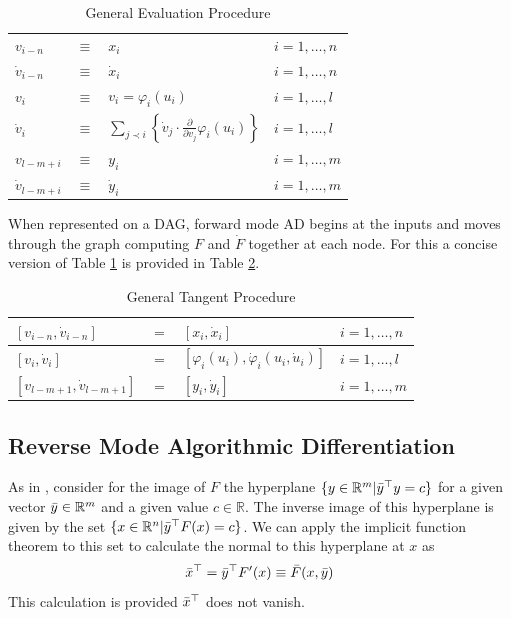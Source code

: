\documentclass{article}
\begin{document}
\begin{table}[h]
    \centering
    \begin{tabular}{|lcll|}
        \hline
        $v_{i-n}$ & $\equiv$ & $x_i$ & $i = 1, \ldots, n$ \\
        $\Dot{v}_{i-n}$ & $\equiv$ & $\Dot{x}_i$ & $i = 1, \ldots, n$ \\
        \hline
        $v_{i}$ & $\equiv$ & $v_i = \varphi_i (u_i)$ & $i = 1, \ldots, l$ \\
        $\Dot{v}_{i}$ & $\equiv$ & $\sum_{j \prec i} \left\{ \Dot{v}_j \cdot \frac{\partial}{\partial v_j} \varphi_i (u_i) \right\}$ & $i = 1, \ldots, l$ \\
        \hline
        $v_{l-m+i}$ & $\equiv$ & $y_i$ & $i = 1, \ldots, m$ \\
        $\Dot{v}_{l-m+i}$ & $\equiv$ & $\Dot{y}_i$ & $i = 1, \ldots, m$ \\
        \hline
    \end{tabular}
    \caption{General Evaluation Procedure}
    \label{tab:gep}
\end{table}

When represented on a DAG, forward mode AD begins at the inputs and moves through the graph computing $F$ and $\Dot{F}$ together at each node. For this a concise version of Table \ref{tab:gep} is provided in Table \ref{tab:gtp}.

\begin{table}[h]
    \centering
    \begin{tabular}{|lcll|}
        \hline
        $[v_{i-n}, \Dot{v}_{i-n}]$ & $=$ & $[x_{i}, \Dot{x}_{i}]$ & $i = 1, \ldots, n$ \\
        \hline
        $[v_{i}, \Dot{v}_{i}]$ & $=$ & $[\varphi_i (u_i), \Dot{\varphi}_i(u_i, \Dot{u}_i)]$ & $i = 1, \ldots, l$ \\
        \hline
        $[v_{l-m+1}, \Dot{v}_{l-m+1}]$ & $=$ & $[y_{i}, \Dot{y}_{i}]$ & $i = 1, \ldots, m$ \\
        \hline
    \end{tabular}
    \caption{General Tangent Procedure}
    \label{tab:gtp}
\end{table}

\subsection{Reverse Mode Algorithmic Differentiation}

As in \cite{dhamarticle}, consider for the image of $F$ the hyperplane $\{ y \in \mathbb{R}^m | \Bar{y}^\top y = c\}$ for a given vector $\Bar{y} \in \mathbb{R}^m$ and a given value $c \in \mathbb{R}$. The inverse image of this hyperplane is given by the set $\{ x \in \mathbb{R}^n | \Bar{y}^\top F(x) = c\}$. We can apply the implicit function theorem to this set to calculate the normal to this hyperplane at $x$ as
\begin{equation}
    \Bar{x}^\top = \Bar{y}^\top F'(x) \equiv \Bar{F}(x, \Bar{y})
\end{equation}
This calculation is provided $\Bar{x}^\top$ does not vanish.
\end{document}
